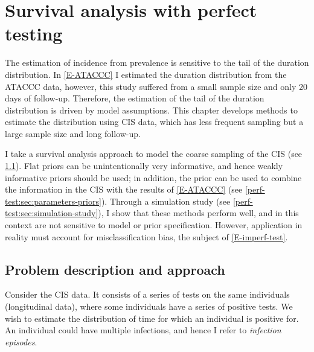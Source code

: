 \documentclass[thesis.tex]{subfiles}
\begin{document}
\chapter{Survival analysis with perfect testing} \label{perf-test}

The estimation of incidence from prevalence is sensitive to the tail of the duration distribution.
In \cref{E-ATACCC} I estimated the duration distribution from the ATACCC data, however, this study suffered from a small sample size and only 20 days of follow-up.
Therefore, the estimation of the tail of the duration distribution is driven by model assumptions.
This chapter develops methods to estimate the distribution using CIS data, which has less frequent sampling but a large sample size and long follow-up.

I take a survival analysis approach to model the coarse sampling of the CIS (see \cref{perf-test:sec:problem}).
Flat priors can be unintentionally very informative, and hence weakly informative priors should be used; in addition, the prior can be used to combine the information in the CIS with the results of \cref{E-ATACCC} (see \cref{perf-test:sec:parameters-priors}).
Through a simulation study (see \cref{perf-test:sec:simulation-study}), I show that these methods perform well, and in this context are not sensitive to model or prior specification.
However, application in reality must account for misclassification bias, the subject of \cref{E-imperf-test}.



\section{Problem description and approach} \label{perf-test:sec:problem}

Consider the CIS data.
It consists of a series of tests on the same individuals (longitudinal data), where some individuals have a series of positive tests.
We wish to estimate the distribution of time for which an individual is positive for.
An individual could have multiple infections, and hence I refer to \emph{infection episodes}.
\end{document}
